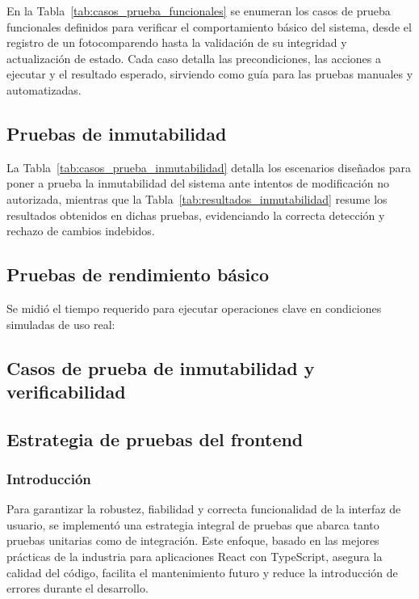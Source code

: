 

\noindent En la Tabla~\ref{tab:casos_prueba_funcionales} se enumeran los casos de prueba funcionales definidos para verificar el comportamiento básico del sistema, desde el registro de un fotocomparendo hasta la validación de su integridad y actualización de estado. Cada caso detalla las precondiciones, las acciones a ejecutar y el resultado esperado, sirviendo como guía para las pruebas manuales y automatizadas.

\subsection{Pruebas de inmutabilidad}



\noindent La Tabla~\ref{tab:casos_prueba_inmutabilidad} detalla los escenarios diseñados para poner a prueba la inmutabilidad del sistema ante intentos de modificación no autorizada, mientras que la Tabla~\ref{tab:resultados_inmutabilidad} resume los resultados obtenidos en dichas pruebas, evidenciando la correcta detección y rechazo de cambios indebidos.

\subsection{Pruebas de rendimiento básico}
Se midió el tiempo requerido para ejecutar operaciones clave en condiciones simuladas de uso real:



\subsection{Casos de prueba de inmutabilidad y verificabilidad}



\subsection{Estrategia de pruebas del frontend}

\subsubsection{Introducción}

Para garantizar la robustez, fiabilidad y correcta funcionalidad de la interfaz de usuario, se implementó una estrategia integral de pruebas que abarca tanto pruebas unitarias como de integración. Este enfoque, basado en las mejores prácticas de la industria para aplicaciones React con TypeScript, asegura la calidad del código, facilita el mantenimiento futuro y reduce la introducción de errores durante el desarrollo.

